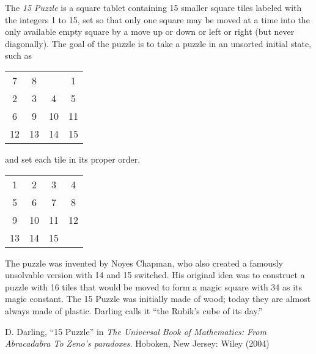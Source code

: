 \documentclass[12pt]{article}
\begin{document}
The {\em 15 Puzzle} is a square tablet containing 15 smaller square tiles labeled with the integers 1 to 15, set so that only one square may be moved at a time into the only available empty square by a move up or down or left or right (but never diagonally). The goal of the puzzle is to take a puzzle in an unsorted initial state, such as

\begin{tabular}{|c|c|c|c|}
7 & 8 & & 1 \\
2 & 3 & 4 & 5 \\
6 & 9 & 10 & 11 \\
12 & 13 & 14 & 15 \\
\end{tabular}

and set each tile in its proper order.

\begin{tabular}{|c|c|c|c|}
1 & 2 & 3 & 4 \\
5 & 6 & 7 & 8 \\
9 & 10 & 11 & 12 \\
13 & 14 & 15 & \\
\end{tabular}

The puzzle was invented by Noyes Chapman, who also created a famously unsolvable version with 14 and 15 switched. His original idea was to construct a puzzle with 16 tiles that would be moved to form a magic square with 34 as its magic constant. The 15 Puzzle was initially made of wood; today they are almost always made of plastic. Darling calls it ``the Rubik's cube of its day.''

\begin{thebibliography}{1}
 D. Darling, ``15 Puzzle'' in {\it The Universal Book of Mathematics: From Abracadabra To Zeno's paradoxes}. Hoboken, New Jersey: Wiley (2004)
\end{thebibliography}
\end{document}
